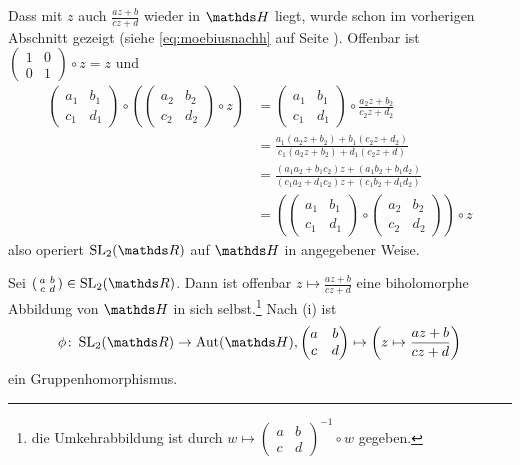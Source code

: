 \begin{bewe-list}
\item Dass mit $z$ auch $\frac{az+b}{cz+d}$ wieder in $\HH$ liegt, wurde schon im vorherigen Abschnitt gezeigt (siehe \eqref{eq:moebiusnachh} auf Seite \pageref{eq:moebiusnachh}).
Offenbar ist $(\begin{smallmatrix} 1 & 0\\0&1\end{smallmatrix}) \circ z = z$ und
\begin{align*}
		\begin{pmatrix}
			a_1 & b_1 \\
			c_1 & d_1
		\end{pmatrix}
		\circ
		\left(\begin{pmatrix}
			a_2 & b_2 \\
			c_2 & d_2
		\end{pmatrix}
		\circ z\right)
	&=
		\begin{pmatrix}
			a_1 & b_1 \\
			c_1 & d_1
		\end{pmatrix}
		\circ
		\frac{a_2z+b_2}{c_2z+d_2} \\
	&= \frac{a_1(a_2z+b_2)+b_1(c_2z+d_2)}{c_1(a_2z+b_2)+d_1(c_2z+d)} \\
	&= \frac{(a_1a_2+b_1c_2)z+(a_1b_2+b_1d_2)}{(c_1a_2+d_1c_2)z + (c_1b_2+d_1d_2)} \\
	&=
		\left(\begin{pmatrix}
			a_1 & b_1 \\
			c_1 & d_1
		\end{pmatrix}
		\circ
		\begin{pmatrix}
			a_2 & b_2 \\
			c_2 & d_2
		\end{pmatrix}\right)
		\circ z
\end{align*}
also operiert $\SL_2(\RR)$ auf $\HH$ in angegebener Weise.

\item Sei $(\begin{smallmatrix}a&b\\c&d\end{smallmatrix}) \in \SL_2(\RR)$.
Dann ist offenbar $z \mapsto \frac{az+b}{cz+d}$ eine biholomorphe Abbildung von $\HH$ in sich selbst.\footnote{die Umkehrabbildung ist durch $w \mapsto (\begin{smallmatrix}a&b\\c&d\end{smallmatrix})^{-1} \circ w$ gegeben.}
Nach (i) ist
\[
	\phi\colon \SL_2(\RR) \ra \Aut(\HH),
		\begin{pmatrix}
			a & b \\
			c & d
		\end{pmatrix}
		\mapsto
		\left( z \mapsto \frac{az+b}{cz+d} \right)
\]
ein Gruppenhomorphismus.


\end{bewe-list}
